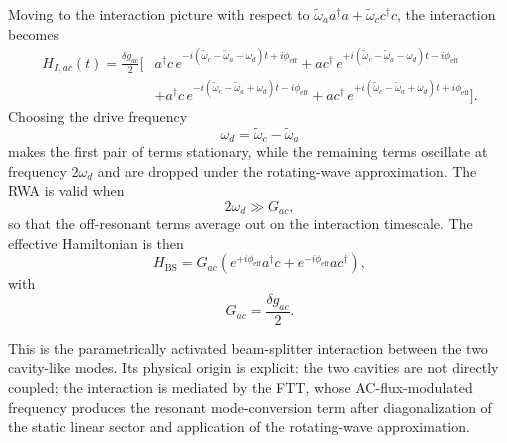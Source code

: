 Moving to the interaction picture with respect to
\(
\tilde\omega_a a^\dagger a
+
\tilde\omega_c c^\dagger c
\),
the interaction becomes
\begin{align}
    H_{I,ac}(t)
    =
    \frac{\delta g_{ac}}{2}
    \Big[
        &
        a^\dagger c\,
        e^{-i(\tilde\omega_c-\tilde\omega_a-\omega_d)t+i\phi_{\mathrm{eff}}}
        +
        a c^\dagger\,
        e^{+i(\tilde\omega_c-\tilde\omega_a-\omega_d)t-i\phi_{\mathrm{eff}}}
        \nonumber\\
        &
        +
        a^\dagger c\,
        e^{-i(\tilde\omega_c-\tilde\omega_a+\omega_d)t-i\phi_{\mathrm{eff}}}
        +
        a c^\dagger\,
        e^{+i(\tilde\omega_c-\tilde\omega_a+\omega_d)t+i\phi_{\mathrm{eff}}}
    \Big].
    \label{eq:Hac_interaction}
\end{align}
Choosing the drive frequency
\begin{equation}
    \omega_d = \tilde\omega_c-\tilde\omega_a
\end{equation}
makes the first pair of terms stationary, while the remaining terms oscillate at frequency \(2\omega_d\) and are dropped under the rotating-wave approximation. The RWA is valid when
\begin{equation}
    2\omega_d \gg G_{ac},
\end{equation}
so that the off-resonant terms average out on the interaction timescale. The effective Hamiltonian is then
\begin{equation}
    H_{\mathrm{BS}}
    =
    G_{ac}
    \left(
        e^{+i\phi_{\mathrm{eff}}}a^\dagger c
        +
        e^{-i\phi_{\mathrm{eff}}}a c^\dagger
    \right),
    \label{eq:HBS_ac}
\end{equation}
with
\begin{equation}
    G_{ac} = \frac{\delta g_{ac}}{2}.
\end{equation}

This is the parametrically activated beam-splitter interaction between the two cavity-like modes. Its physical origin is explicit: the two cavities are not directly coupled; the interaction is mediated by the FTT, whose AC-flux-modulated frequency produces the resonant mode-conversion term after diagonalization of the static linear sector and application of the rotating-wave approximation.



